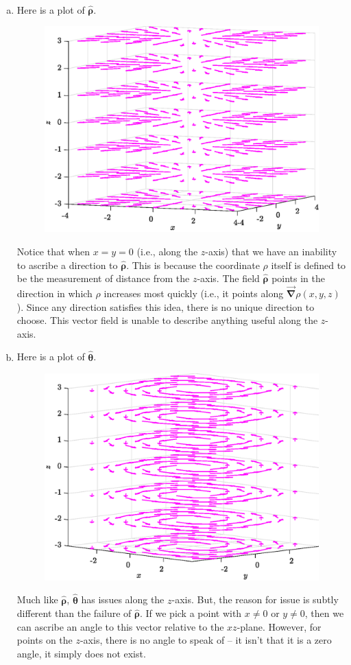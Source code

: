 \documentclass[12pt]{article} %
\newcommand{\grad}{\boldsymbol{\vec{\nabla}}}
\newcommand{\thetahat}{\boldsymbol{\hat{\theta}}}
\newcommand{\rhohat}{\boldsymbol{\hat{\rho}}}
\begin{document}
\begin{solution}~
\begin{enumerate}[(a)]
    \item Here is a plot of $\rhohat$.
    \begin{figure}[H]
        \centering
        \includegraphics[width=.6\textwidth]{figures/rho_hat}
    \end{figure}
    Notice that when $x=y=0$ (i.e., along the $z$-axis) that we have an inability to ascribe a direction to $\rhohat$. This is because the coordinate $\rho$ itself is defined to be the measurement of distance from the $z$-axis. The field $\rhohat$ points in the direction in which $\rho$ increases most quickly (i.e., it points along $\grad \rho(x,y,z)$). Since any direction satisfies this idea, there is no unique direction to choose. This vector field is unable to describe anything useful along the $z$-axis.

    \item Here is a plot of $\thetahat$.
    \begin{figure}[H]
        \centering
        \includegraphics[width=.6\textwidth]{figures/theta_hat}
    \end{figure}
    Much like $\rhohat$, $\thetahat$ has issues along the $z$-axis. But, the reason for issue is subtly different than the failure of $\rhohat$. If we pick a point with $x\neq 0$ or $y\neq 0$, then we can ascribe an angle to this vector relative to the $xz$-plane. However, for points on the $z$-axis, there is no angle to speak of -- it isn't that it is a zero angle, it simply does not exist. 


\end{enumerate}
\end{solution}
\end{document}

